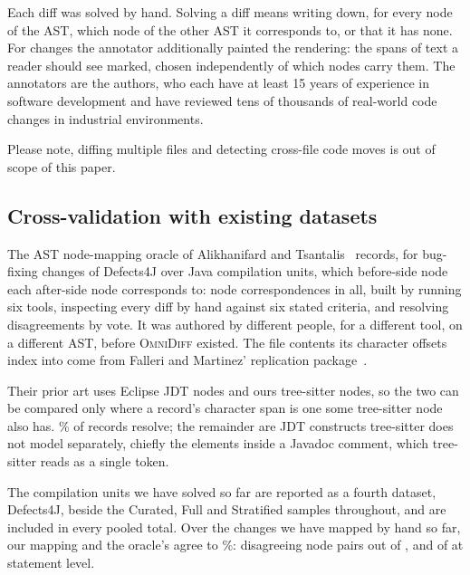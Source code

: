\documentclass[sigconf]{acmart}
\begin{document}
Each diff was solved by hand. Solving a diff means writing down, for every node of the
AST, which node of the other AST it corresponds to, or that it has none. For
\PaintingFixtures{} changes the
annotator additionally painted the rendering: the spans of text a reader should see marked, chosen
independently of which nodes carry them. The annotators are the authors, who each have at least
15 years of experience in software development and have reviewed tens of thousands of real-world
code changes in industrial environments.


Please note, diffing multiple files and detecting cross-file code moves is out of scope of this paper.

\subsection{Cross-validation with existing datasets}
\label{sec:oracle}

The AST node-mapping oracle of Alikhanifard and Tsantalis~\cite{astdiffbenchmark} records, for
\OracleCases{} bug-fixing changes of Defects4J over
\OracleUnits{} Java compilation units, which before-side node each after-side node corresponds to:
\OracleRecords{} node correspondences in all, built by running six tools, inspecting every diff by
hand against six stated criteria, and resolving disagreements by vote. It was authored by different people, for a
different tool, on a different AST, before \textsc{OmniDiff} existed. The file contents its
character offsets index into come from Falleri and Martinez' replication
package~\cite{gumtreesimple}.

Their prior art uses Eclipse JDT nodes and ours tree-sitter nodes, so the two can be compared only where
a record's character span is one some tree-sitter node also has. \OracleResolutionRate{}\% of
records resolve; the remainder are JDT constructs tree-sitter does not model separately, chiefly
the elements inside a Javadoc comment, which tree-sitter reads as a single token.

The \AmbiguityDefectsFourJTotal{} compilation units we have solved so far are reported as a fourth
dataset, Defects4J, beside the Curated, Full and Stratified samples throughout, and are included in
every pooled total. Over the \OracleHumanUnits{} changes we
have mapped by hand so far, our mapping and the oracle's agree to \OracleHumanPrecision{}\%: \OracleHumanDisagreements{} disagreeing node pairs out of
\OracleHumanMappings{}, and \OracleHumanStatementDisagreements{} of
\OracleHumanStatementMappings{} at statement level.
\end{document}

